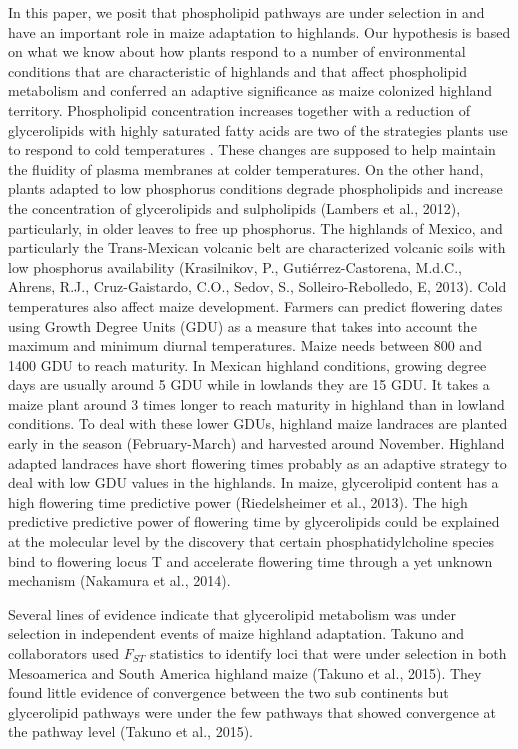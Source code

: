 \documentclass[9pt,twocolumn,twoside,lineno]{gsajnl}
\begin{document}
In this paper, we posit that phospholipid pathways are under selection in and have an important role in maize adaptation to highlands.  
Our hypothesis is based on what we know about how plants respond to a number of environmental conditions that are characteristic of highlands and that affect phospholipid metabolism and conferred an adaptive significance as maize colonized highland territory. 
Phospholipid concentration increases \citep{Degenkolbe2012-wf} together with a reduction of glycerolipids with highly saturated fatty acids \citep{Welti2002-uk} are two of the strategies plants use to respond to cold temperatures \cite{Lynch1987-ln}. 
These changes are supposed to help maintain the fluidity of plasma membranes at colder temperatures. On the other hand, plants adapted to low phosphorus conditions degrade phospholipids and increase the concentration of glycerolipids and sulpholipids (Lambers et al., 2012), particularly, in older leaves to free up phosphorus. 
The highlands of Mexico, and particularly the Trans-Mexican volcanic belt are characterized volcanic soils with low phosphorus availability (Krasilnikov, P., Gutiérrez-Castorena, M.d.C., Ahrens, R.J., Cruz-Gaistardo, C.O., Sedov, S., Solleiro-Rebolledo, E, 2013). 
Cold temperatures also affect maize development. Farmers can predict flowering dates using Growth Degree Units (GDU) as a measure  that takes into account the maximum and minimum diurnal temperatures. 
Maize needs between 800 and 1400 GDU to reach maturity. 
In Mexican highland conditions, growing degree days are usually around 5 GDU while in lowlands they are 15 GDU. %
It takes a maize plant around 3 times longer to reach maturity in highland than in lowland conditions. To deal with these lower GDUs, highland maize landraces are planted early in the season (February-March) and harvested around November. 
Highland adapted landraces have short flowering times probably as an adaptive strategy to deal with low GDU values in the highlands.  
In maize, glycerolipid content has a high flowering time predictive power (Riedelsheimer et al., 2013). 
The high predictive predictive power of flowering time by glycerolipids could be explained at the molecular level by the discovery that certain phosphatidylcholine species bind to flowering locus T and accelerate flowering time through a yet unknown mechanism (Nakamura et al., 2014). 
 
Several lines of evidence indicate that glycerolipid metabolism was under selection in independent events of maize highland adaptation. 
Takuno and collaborators used $F_{ST}$ statistics to identify loci that were under selection in both Mesoamerica and South America highland maize (Takuno et al., 2015). 
They found little evidence of convergence between the two sub continents but glycerolipid pathways were under the few pathways that showed convergence at the pathway level (Takuno et al., 2015). 
\end{document}
